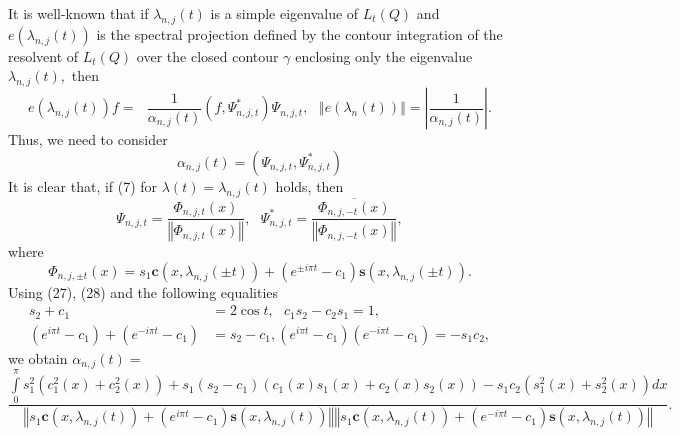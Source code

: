 \documentclass{article}%
\begin{document}
It is well-known that if $\lambda_{n,j}(t)$ is a simple eigenvalue of
$L_{t}(Q)$ and $e(\lambda_{n,j}(t))$ is the spectral projection defined by the
contour integration of the resolvent of $L_{t}(Q)$ over the closed contour
$\gamma$ enclosing only the eigenvalue $\lambda_{n,j}(t),$ then%
\begin{equation}
e(\lambda_{n,j}(t))f=\text{ }\frac{1}{\alpha_{n,j}(t)}(f,\Psi_{n,j,t}^{\ast
})\Psi_{n,j,t},\text{ }\left\Vert e(\lambda_{n}(t))\right\Vert =\left\vert
\frac{1}{\alpha_{n,j}(t)}\right\vert . \tag{26}%
\end{equation}
Thus, we need to consider
\begin{equation}
\alpha_{n,j}(t)=\left(  \Psi_{n,j,t},\Psi_{n,j,t}^{\ast}\right)  \tag{27}%
\end{equation}
It is clear that, if (7) for $\lambda(t)=\lambda_{n,j}(t)$ holds, then
\begin{equation}
\Psi_{n,j,t}=\frac{\Phi_{n,j,t}(x)}{\left\Vert \Phi_{n,j,t}(x)\right\Vert
},\text{ }\Psi_{n,j,t}^{\ast}=\frac{\overline{\Phi_{n,j,-t}(x)}}{\left\Vert
\Phi_{n,j,-t}(x)\right\Vert }, \tag{28}%
\end{equation}
where
\[
\Phi_{n,j,\pm t}(x)=s_{1}\mathbf{c}(x,\lambda_{n,j}(\pm t))+\left(  e^{\pm
i\pi t}-c_{1}\right)  \mathbf{s}(x,\lambda_{n,j}(\pm t)).
\]
Using (27), (28) and the following equalities
\begin{align*}
s_{2}+c_{1}  &  =2\cos t,\text{ }c_{1}s_{2}-c_{2}s_{1}=1,\\
\left(  e^{i\pi t}-c_{1}\right)  +\left(  e^{-i\pi t}-c_{1}\right)   &
=s_{2}-c_{1},\left(  e^{i\pi t}-c_{1}\right)  \left(  e^{-i\pi t}%
-c_{1}\right)  =-s_{1}c_{2},
\end{align*}
we obtain $\alpha_{n,j}(t)=$
\begin{equation}
\frac{\int\limits_{0}^{\pi}s_{1}^{2}\left(  c_{1}^{2}(x)+c_{2}^{2}(x)\right)
+s_{1}\left(  s_{2}-c_{1}\right)  (c_{1}(x)s_{1}(x)+c_{2}(x)s_{2}%
(x))-s_{1}c_{2}\left(  s_{1}^{2}(x)+s_{2}^{2}(x)\right)  dx}{\left\Vert
s_{1}\mathbf{c}(x,\lambda_{n,j}(t))+\left(  e^{i\pi t}-c_{1}\right)
\mathbf{s}(x,\lambda_{n,j}(t))\right\Vert \left\Vert s_{1}\mathbf{c}%
(x,\lambda_{n,j}(t))+\left(  e^{-i\pi t}-c_{1}\right)  \mathbf{s}%
(x,\lambda_{n,j}(t))\right\Vert }. \tag{29}%
\end{equation}
\end{document}

